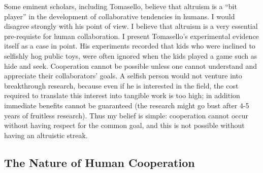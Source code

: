 \documentclass[12pt, letter]{article}
\begin{document}
Some eminent scholars, including Tomasello, believe that altruism is a ``bit player'' \cite{tomasello2008origins} in the development of collaborative tendencies in humans. I would disagree strongly with his point of view. I believe that altruism is a very essential pre-requiste for human collaboration. I present Tomasello's experimental evidence itself as a case in point. His experiments recorded that kids who were inclined to selfishly hog public toys, were often ignored when the kids played a game such as hide and seek. Cooperation cannot be possible unless one cannot understand and appreciate their collaborators' goals. A selfish person would not venture into breakthrough research, because even if he is interested in the field, the cost required to translate this interest into tangible work is too high; in addition immediate benefits cannot be guaranteed (the research might go bust after 4-5 years of fruitless research). Thus my belief is simple: cooperation cannot occur without having respect for the common goal, and this is not possible without having an altruistic streak.

\subsection*{The Nature of Human Cooperation}
\end{document}
